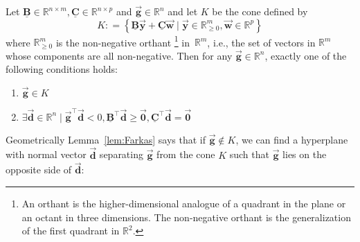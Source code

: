 \documentclass[9pt, headings=standardclasses, parskip=half]{scrartcl}
\newcommand{\matr}[1]{\underline{\boldsymbol{#1}}}
\newcommand{\vect}[1]{\vec{\boldsymbol{#1}}}
\newcommand{\R}{\mathbb{R}}
\begin{document}
\begin{lemma}[Farkas]\label{lem:Farkas}
  Let \( \matr{B}\in\R^{n\times m}, \matr{C}\in\R^{n\times p} \) and \( \vect{g}\in\R^{n} \) and let \(K\) be the cone defined by
  \begin{equation}\label{eq:cone_K}
  K : = \left\{ \matr{B} \vect{y} + \matr{C} \vect{w} \mid \vect{y} \in \R^m_{\ge 0}, \vect{w}\in\R^{p} \right\} 
\end{equation}
  where \(\R^m_{\ge 0}\) is the non-negative orthant%
  \footnote{An orthant is the higher-dimensional analogue of a quadrant in the plane or an octant in three dimensions. The non-negative orthant is the generalization of the first quadrant in \(\R^2\).}
  in~\( \R^m \), i.e., the set of vectors in \(\R^m\) whose components are all non-negative.
  Then for any \(\vect{g} \in \R^n\), exactly one of the following conditions holds:
  \begin{enumerate}[label=(\alph*)]
    \item \( \vect{g} \in K \) \label{item:Farkas_in_K}
    \item \( \exists \vect{d}\in\R^{n} \mid \vect{g}^{\top} \vect{d} < 0, \matr{B}^{\top} \vect{d} \ge \vect{0}, \matr{C}^{\top} \vect{d} = \vect{0} \) \qedhere\label{item:Farkas_hyperplane}
  \end{enumerate}
\end{lemma}
  Geometrically Lemma~\ref{lem:Farkas} says that if \(\vect{g} \notin K\), we can find a hyperplane with normal vector \(\vect{d}\) separating \(\vect{g}\) from the cone \(K\) such that \(\vect{g}\) lies on the opposite side of \(\vect{d}\):
\end{document}
